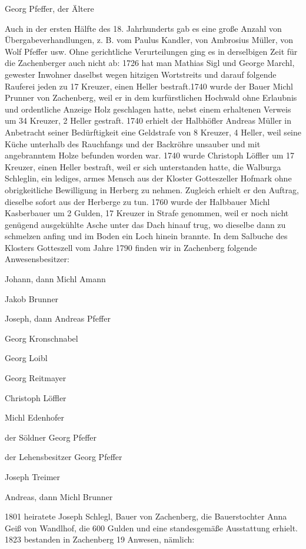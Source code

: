 \documentclass[12pt,a4pager]{book}
\begin{document}
Georg Pfeffer, der Ältere

Auch in der ersten Hälfte des 18. Jahrhunderts gab es eine große Anzahl von
Übergabeverhandlungen, z. B. vom Paulus Kandler, von Ambrosius Müller, von Wolf
Pfeffer usw. Ohne gerichtliche Verurteilungen ging es in derselbigen Zeit für
die Zachenberger auch nicht ab: 1726 hat man Mathias Sigl und George Marchl,
gewester Inwohner daselbst wegen hitzigen Wortstreits und darauf folgende
Rauferei jeden zu 17 Kreuzer, einen Heller bestraft.1740 wurde der Bauer Michl
Prunner von Zachenberg, weil er in dem kurfürstlichen Hochwald ohne Erlaubnis
und ordentliche Anzeige Holz geschlagen hatte, nebst einem erhaltenen Verweis um
34 Kreuzer, 2 Heller gestraft. 1740 erhielt der Halbhöfler Andreas Müller in
Anbetracht seiner Bedürftigkeit eine Geldstrafe von 8 Kreuzer, 4 Heller, weil
seine Küche unterhalb des Rauchfangs und der Backröhre unsauber und mit
angebranntem Holze befunden worden war. 1740 wurde Christoph Löffler um 17
Kreuzer, einen Heller bestraft, weil er sich unterstanden hatte, die Walburga
Schleglin, ein lediges, armes Mensch aus der Kloster Gotteszeller Hofmark ohne
obrigkeitliche Bewilligung in Herberg zu nehmen. Zugleich erhielt er den
Auftrag, dieselbe sofort aus der Herberge zu tun. 1760 wurde der Halbbauer Michl
Kasberbauer um 2 Gulden, 17 Kreuzer in Strafe genommen, weil er noch nicht
genügend ausgekühlte Asche unter das Dach hinauf trug, wo dieselbe dann zu
schmelzen anfing und im Boden ein Loch hinein brannte. In dem Salbuche des
Klosters Gotteszell vom Jahre 1790 finden wir in Zachenberg folgende
Anwesensbesitzer:

Johann, dann Michl Amann

Jakob Brunner

Joseph, dann Andreas Pfeffer

Georg Kronschnabel

Georg Loibl

Georg Reitmayer

Christoph Löffler

Michl Edenhofer

der Söldner Georg Pfeffer

der Lehensbesitzer Georg Pfeffer

Joseph Treimer

Andreas, dann Michl Brunner

1801 heiratete Joseph Schlegl, Bauer von Zachenberg, die Bauerstochter Anna Geiß
von Wandlhof, die 600 Gulden und eine standesgemäße Ausstattung erhielt. 1823
bestanden in Zachenberg 19 Anwesen, nämlich:
\end{document}
